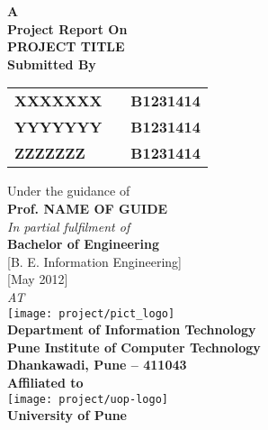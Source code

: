 
\newpage


\begin{center}
\thispagestyle{empty}


\Large{\textbf{A\\Project Report On}}\\[0.7cm]
\Large{\textsc {\textbf{PROJECT TITLE}}}\\[0.5cm]
\Large{\textbf{Submitted By}}\\[0.5cm]
\begin{table}[h]
\centering
\begin{tabular}{>{\bfseries}lc>{\bfseries}r}
XXXXXXX & & B1231414\\ %
YYYYYYY & & B1231414\\ %
ZZZZZZZ & & B1231414\\ %
\end{tabular}
\end{table}
\large{Under the guidance of}\\[0.5cm]
\Large{\textbf{Prof. NAME OF GUIDE}}\\[0.4cm]
\large{\emph{In partial fulfilment of}}\\
\LARGE{\textbf{Bachelor of Engineering}}\\
\LARGE{{[}B. E. Information Engineering{]}}\\[0.5cm]
\LARGE{{[}May 2012{]}}\\
\Large{\emph{AT}}\\[0.2cm]



\texttt{[image: project/pict\_logo]}\\
\large{\textbf{Department of Information Technology}}\\
\LARGE{\textbf{Pune Institute of Computer Technology}}\\
\Large{\textbf{Dhankawadi, Pune – 411043}}\\[0.5cm]
\Large{\textbf{Affiliated to}}\\[0.5cm]
\texttt{[image: project/uop-logo]}\\
\LARGE{\textbf{University of Pune}}
\newpage

\end{center}


